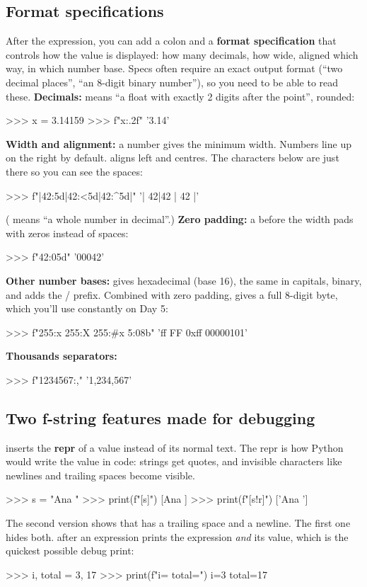 \documentclass[10pt,a4paper]{article}
\begin{document}
\subsection{Format specifications}
After the expression, you can add a colon and a \textbf{format specification} that controls how the value is displayed: how many decimals, how wide, aligned which way, in which number base. Specs often require an exact output format (“two decimal places”, “an 8-digit binary number”), so you need to be able to read these.
\textbf{Decimals:}  means “a float with exactly 2 digits after the point”, rounded:
\begin{txtcode}
>>> x = 3.14159
>>> f"{x:.2f}"
'3.14'
\end{txtcode}
\textbf{Width and alignment:} a number gives the minimum width. Numbers line up on the right by default. \code{\textless{}\allowbreak{}} aligns left and \code{\textasciicircum{}} centres. The \code{\textbar{}\allowbreak{}} characters below are just there so you can see the spaces:
\begin{txtcode}
>>> f"|{42:5d}|{42:<5d}|{42:^5d}|"
'|   42|42   | 42  |'
\end{txtcode}
( means “a whole number in decimal”.)
\textbf{Zero padding:} a  before the width pads with zeros instead of spaces:
\begin{txtcode}
>>> f"{42:05d}"
'00042'
\end{txtcode}
\textbf{Other number bases:}  gives hexadecimal (base 16),  the same in capitals,  binary, and \code{\#} adds the / prefix. Combined with zero padding,  gives a full 8-digit byte, which you’ll use constantly on Day 5:
\begin{txtcode}
>>> f"{255:x}  {255:X}  {255:#x}  {5:08b}"
'ff  FF  0xff  00000101'
\end{txtcode}
\textbf{Thousands separators:}
\begin{txtcode}
>>> f"{1234567:,}"
'1,234,567'
\end{txtcode}
\subsection{Two f-string features made for debugging}
 inserts the \textbf{repr} of a value instead of its normal text. The repr is how Python would write the value in code: strings get quotes, and invisible characters like newlines and trailing spaces become visible.
\begin{txtcode}
>>> s = "Ana \n"
>>> print(f"[{s}]")
[Ana
]
>>> print(f"[{s!r}]")
['Ana \n']
\end{txtcode}
The second version shows that  has a trailing space and a newline. The first one hides both.
\code{=\allowbreak{}} after an expression prints the expression \emph{and} its value, which is the quickest possible debug print:
\begin{txtcode}
>>> i, total = 3, 17
>>> print(f"{i=} {total=}")
i=3 total=17
\end{txtcode}
\setcounter{section}{4}
\end{document}
